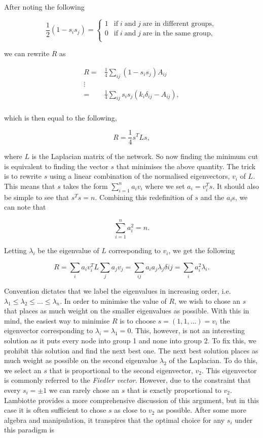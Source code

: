 \noindent
After noting the following

$$ \frac{1}{2}(1 - s_i s_j) = 
\begin{cases}
    1 & \text{if} \; i \; \text{and} \; j \; \text{are in different groups}, \\
    0 & \text{if} \; i \; \text{and} \; j \; \text{are in the same group}, \\
\end{cases}
$$

\noindent
we can rewrite $R$ as

$$
\begin{aligned}
    R =& \frac{1}{4}\sum_{ij}(1 - s_i s_j)A_{ij} \\
      \vdots & \\
      =& \frac{1}{4}\sum_{ij}s_i s_j(k_i\delta_{ij} - A_{ij}), \\
\end{aligned}
$$

\noindent
which is then equal to the following,

$$ R = \frac{1}{4}s^TLs, $$

\noindent
where $L$ is the Laplacian matrix of the network. So now finding the minimum cut is equivalent to finding the vector $s$ that minimises the above quantity. The trick is to rewrite $s$ using a linear combination of the normalised eigenvectors, $v_i$ of $L$. This means that $s$ takes the form $\sum_{i=1}^n a_iv_i$ where we set $a_i = v_i^T s$. It should also be simple to see that $s^Ts = n$. Combining this redefinition of $s$ and the $a_i$s, we can note that

$$ \sum_{i=1}^n a_i^2 = n. $$

\noindent
Letting $\lambda_i$ be the eigenvalue of $L$ corresponding to $v_i$, we get the following

$$ R = \sum_i a_iv_i^TL\sum_ja_jv_j = \sum_{ij}a_ia_j\lambda_j\delta{ij} = \sum_{i}a_i^2\lambda_i. $$

Convention dictates that we label the eigenvalues in increasing order, i.e. $\lambda_1 \leq \lambda_2 \leq \dots \leq \lambda_n$. In order to minimise the value of $R$, we wish to chose an $s$ that places as much weight on the smaller eigenvalues as possible. With this in mind, the easiest way to minimise $R$ is to choose $s = (1, 1, \dots) = v_i$ the eigenvector corresponding to $\lambda_i = \lambda_1 = 0$. This, however, is not an interesting solution as it puts every node into group 1 and none into group 2. To fix this, we prohibit this solution and find the next best one. The next best solution places as much weight as possible on the second eigenvalue $\lambda_2$ of the Laplacian. To do this, we select an $s$ that is proportional to the second eigenvector, $v_2$. This eigenvector is commonly referred to the \emph{Fiedler vector}. However, due to the constraint that every $s_i = \pm 1$ we can rarely chose an $s$ that is exactly proportional to $v_2$. Lambiotte provides a more comprehensive discussion of this argument, but in this case it is often sufficient to chose $s$ as close to $v_2$ as possible. After some more algebra and manipulation, it transpires that the optimal choice for any $s_i$ under this paradigm is 

